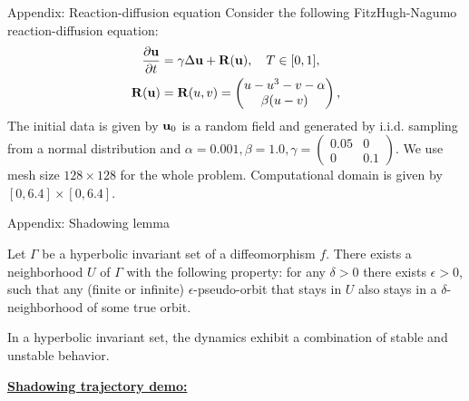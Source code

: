 \documentclass[NUS-Kajima workshop]{beamer}
\begin{document}
\begin{frame}{Appendix: Reaction-diffusion equation}
	Consider the following FitzHugh-Nagumo reaction-diffusion equation:
	\begin{equation}
    \begin{aligned}
        	\frac{\partial \mathbf{u}}{\partial t} & = \gamma \Delta \mathbf{u} + \mathbf{R}(\mathbf{u}), \quad T \in [0, 1], 	\\
		\mathbf{R}(\mathbf{u}) & = \mathbf{R}(u, v) = \begin{pmatrix}
			u - u^3 - v - \alpha	\\
			\beta(u - v)
		\end{pmatrix},
    \end{aligned}
	\end{equation}
	The initial data is given by $\mathbf{u}_0$ is a random field and generated by i.i.d. sampling from a normal distribution and $\alpha = 0.001, \beta=1.0, \gamma = \begin{pmatrix}
		0.05 & 0	\\
		0 & 0.1
	\end{pmatrix}$. We use mesh size $128 \times 128$ for the whole problem. Computational domain is given by $[0, 6.4]\times[0, 6.4]$.
\end{frame}

\begin{frame}{Appendix: Shadowing lemma}
	\begin{theorem}
		Let $\Gamma$ be a hyperbolic invariant set of a diffeomorphism $f$. There exists a 
		neighborhood $U$ of $\Gamma$ with the following property: for any $\delta > 0$ there 
		exists $\epsilon > 0$, such that any (finite or infinite) $\epsilon$-pseudo-orbit that 
		stays in $U$ also stays in a $\delta$-neighborhood of some true orbit\footnotemark.
	\end{theorem}
	In a hyperbolic invariant set, the dynamics exhibit a combination of stable and unstable behavior.

	\href{https://www.youtube.com/watch?v=07jkQ1ox7vI&t=290s}{\textbf{Shadowing trajectory demo:}}
\end{frame}
\end{document}
